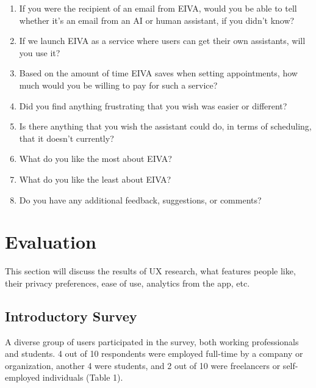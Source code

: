 \documentclass{article}
\begin{document}
\begin{enumerate}
	\item If you were the recipient of an email from EIVA, would you be able to tell whether it's an email from an AI or human assistant, if you didn't know?
	\item If we launch EIVA as a service where users can get their own assistants, will you use it?
	\item Based on the amount of time EIVA saves when setting appointments, how much would you be willing to pay for such a service?
	\item Did you find anything frustrating that you wish was easier or different?
	\item Is there anything that you wish the assistant could do, in terms of scheduling, that it doesn't currently?
	\item What do you like the most about EIVA?
	\item What do you like the least about EIVA?
	\item Do you have any additional feedback, suggestions, or comments?
\end{enumerate}

\newpage

\section{Evaluation}

This section will discuss the results of UX research, what features people like, their privacy preferences, ease of use, analytics from the app, etc.

\subsection{Introductory Survey}

A diverse group of users participated in the survey, both working professionals and students. 4 out of 10 respondents were employed full-time by a company or organization, another 4 were students, and 2 out of 10 were freelancers or self-employed individuals (Table 1).
\end{document}
